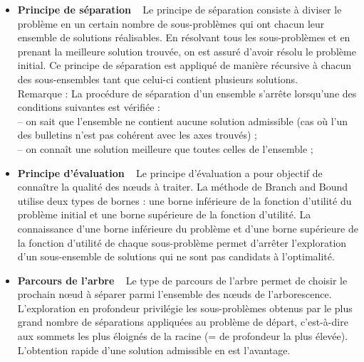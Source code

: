 \documentclass[12pt]{article}
\begin{document}
\begin{itemize}

\item \textbf{Principe de s\'{e}paration} ~ Le principe de s\'{e}paration consiste \`{a} diviser le probl\`{e}me en un certain nombre de sous-probl\`{e}mes qui ont chacun leur ensemble de solutions r\'{e}alisables. En r\'{e}solvant tous les sous-probl\`{e}mes et en prenant la meilleure solution trouv\'{e}e, on est assur\'{e} d'avoir r\'{e}solu le probl\`{e}me initial. Ce principe de s\'{e}paration est appliqu\'{e} de mani\`{e}re r\'{e}cursive \`{a} chacun des sous-ensembles tant que celui-ci contient plusieurs solutions. \\
Remarque : La proc\'{e}dure de s\'{e}paration d'un ensemble s'arr\^{e}te lorsqu'une des conditions
suivantes est v\'{e}rifi\'{e}e : \\
-- on sait que l'ensemble ne contient aucune solution admissible (cas o\`{u} l'un des bulletins n'est pas coh\'{e}rent avec les axes trouv\'{e}s) ; \\
-- on conna\^{i}t une solution meilleure que toutes celles de l'ensemble ; \\

\item \textbf{Principe d'\'{e}valuation} ~  Le principe d'\'{e}valuation a pour objectif de conna\^{i}tre la qualit\'{e} des n\oe{}uds \`{a} traiter. La m\'{e}thode de \og Branch and Bound \fg{} utilise deux types de bornes : une borne inf\'{e}rieure de la fonction d'utilit\'{e} du probl\`{e}me initial et une borne sup\'{e}rieure de la fonction d'utilit\'{e}. La connaissance d'une borne inf\'{e}rieure du probl\`{e}me et d'une borne sup\'{e}rieure de la fonction d'utilit\'{e} de chaque sous-probl\`{e}me permet d'arr\^{e}ter  l'exploration d'un sous-ensemble de
solutions qui ne sont pas candidats \`{a} l'optimalit\'{e}. \\

\item \textbf{Parcours de l'arbre} ~ Le type de parcours de l'arbre permet de choisir le prochain n\oe{}ud \`{a} s\'{e}parer parmi l'ensemble des n\oe{}uds de l'arborescence. L'exploration en profondeur privil\'{e}gie les sous-probl\`{e}mes obtenus par le plus grand nombre de s\'{e}parations appliqu\'{e}es au probl\`{e}me de d\'{e}part, c'est-\`{a}-dire aux sommets les plus \'{e}loign\'{e}s de la racine (= de profondeur la plus \'{e}lev\'{e}e). L'obtention rapide d'une solution admissible en est l'avantage.

\end{itemize}
\end{document}
